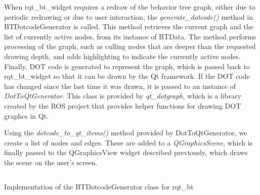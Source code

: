 \documentclass[\rootfolder/main.tex]{subfiles}
\begin{document}
When rqt\_bt\_widget requires a redraw of the behavior tree graph, either due to periodic redrawing or due to user interaction, the \emph{generate\_dotcode()} method in BTDotcodeGenerator is called.
This method retrieves the current graph and the list of currently active nodes, from its instance of BTData.
The method performs processing of the graph, such as culling nodes that are deeper than the requested drawing depth, and adds highlighting to indicate the currently active nodes.
Finally, DOT code is generated to represent the graph, which is passed back to rqt\_bt\_widget so that it can be drawn by the Qt framework.
If the DOT code has changed since the last time it was drawn, it is passed to an instance of \emph{DotToQtGenerator}.
This class is provided by \emph{qt\_dotgraph}, which is a library created by the ROS project that provides helper functions for drawing DOT graphcs in Qt.

Using the \emph{dotcode\_to\_qt\_items()} method provided by DotToQtGenerator, we create a list of nodes and edges.
These are added to a \emph{QGraphicsScene}, which is finally passed to the QGraphicsView widget described previously, which draws the scene on the user's screen.

\begin{listing}
    \inputminted{Python}{\rootfolder/Chapters/Chapter4/Listings/dotcode.py}
    \caption{Implementation of the BTDotcodeGenerator class for rqt\_bt}
    \label{lst:btdotcode}
\end{listing}
\end{document}
